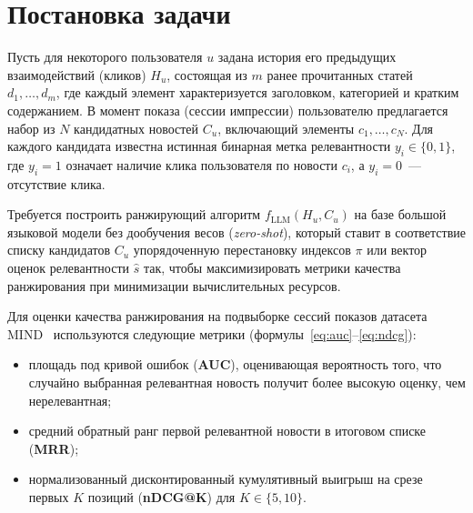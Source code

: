 \documentclass{misisarticle}
\begin{document}
\section{Постановка задачи}

Пусть для некоторого пользователя $u$ задана история его предыдущих взаимодействий (кликов) $H_u$, состоящая из $m$ ранее прочитанных статей $d_1, \dots, d_m$, где каждый элемент характеризуется заголовком, категорией и кратким содержанием. В момент показа (сессии импрессии) пользователю предлагается набор из $N$ кандидатных новостей $C_u$, включающий элементы $c_1, \dots, c_N$. Для каждого кандидата известна истинная бинарная метка релевантности $y_i \in \{0, 1\}$, где $y_i = 1$ означает наличие клика пользователя по новости $c_i$, а $y_i = 0$~--- отсутствие клика.

Требуется построить ранжирующий алгоритм $f_{\mathrm{LLM}}(H_u, C_u)$ на базе большой языковой модели без дообучения весов (\textit{zero-shot}), который ставит в соответствие списку кандидатов $C_u$ упорядоченную перестановку индексов $\pi$ или вектор оценок релевантности $\hat{s}$ так, чтобы максимизировать метрики качества ранжирования при минимизации вычислительных ресурсов.

Для оценки качества ранжирования на подвыборке сессий показов датасета MIND~\cite{wu2020mind} используются следующие метрики (формулы~\eqref{eq:auc}--\eqref{eq:ndcg}):

\begin{itemize}
  \item площадь под кривой ошибок (\textbf{AUC}), оценивающая вероятность того, что случайно выбранная релевантная новость получит более высокую оценку, чем нерелевантная;
  \item средний обратный ранг первой релевантной новости в итоговом списке (\textbf{MRR});
  \item нормализованный дисконтированный кумулятивный выигрыш на срезе первых $K$ позиций (\textbf{nDCG@K}) для $K \in \{5, 10\}$.
\end{itemize}
\end{document}
